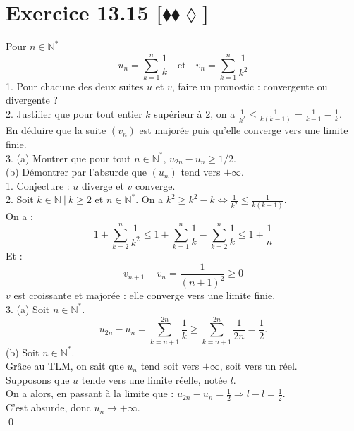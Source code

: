 \documentclass[10pt]{article}
\begin{document}
\section*{Exercice 13.15 [$\blacklozenge\blacklozenge\lozenge$]}
\begin{tcolorbox}[enhanced, width=7.6in, center, size=fbox, fontupper=\large, drop shadow southwest]
    Pour $n\in\mathbb{N}^*$
    \begin{equation*}
        u_n = \sum_{k=1}^{n}\frac{1}{k} \quad \text{et} \quad v_n = \sum_{k=1}^{n}\frac{1}{k^2}
    \end{equation*}
    1. Pour chacune des deux suites $u$ et $v$, faire un pronostic : convergente ou divergente ?\\
    2. Justifier que pour tout entier $k$ supérieur à 2, on a $\frac{1}{k^2} \leq \frac{1}{k(k-1)} = \frac{1}{k-1} - \frac{1}{k}$.\\
    En déduire que la suite $(v_n)$ est majorée puis qu'elle converge vers une limite finie.\\
    3. (a) Montrer que pour tout $n\in\mathbb{N}^*$, $u_{2n} - u_n \geq 1/2$.\\
    (b) Démontrer par l'absurde que $(u_n)$ tend vers $+\infty$.\\
    1. Conjecture : $u$ diverge et $v$ converge.\\
    2. Soit $k\in\mathbb{N} ~ | ~ k \geq 2$ et $n\in\mathbb{N}^*$. On a $k^2 \geq k^2 - k \iff \frac{1}{k^2} \leq \frac{1}{k(k-1)}$.\\
    On a :
    \begin{equation*}
        1 + \sum_{k=2}^{n}\frac{1}{k^2} \leq 1 + \sum_{k=1}^{n}\frac{1}{k} - \sum_{k=2}^n\frac{1}{k} \leq 1 + \frac{1}{n}
    \end{equation*}
    Et :
    \begin{equation*}
        v_{n+1} - v_n = \frac{1}{(n+1)^2} \geq 0
    \end{equation*}
    $v$ est croissante et majorée : elle converge vers une limite finie.\\
    3. (a) Soit $n\in\mathbb{N}^*$.
    \begin{equation*}
        u_{2n} - u_n = \sum_{k=n+1}^{2n}\frac{1}{k}\geq\sum_{k=n+1}^{2n}{\frac{1}{2n}}=\frac{1}{2}.
    \end{equation*}
    (b) Soit $n\in\mathbb{N}^*$.\\
    Grâce au TLM, on sait que $u_n$ tend soit vers $+\infty$, soit vers un réel.\\
    Supposons que $u$ tende vers une limite réelle, notée $l$.\\
    On a alors, en passant à la limite que : $u_{2n} - u_n = \frac{1}{2} \Longrightarrow l-l = \frac{1}{2}$.\\
    C'est absurde, donc $u_n \longrightarrow +\infty$.\\
    \qed
\end{tcolorbox}
\end{document}
